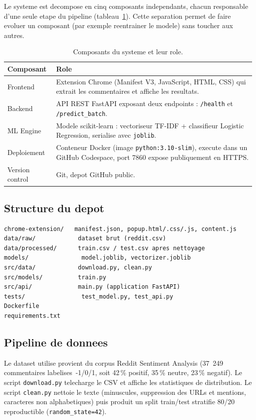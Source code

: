 \documentclass[11pt,a4paper]{article}
\begin{document}
Le systeme est decompose en cinq composants independants, chacun responsable d'une seule etape du pipeline (tableau~\ref{tab:composants}). Cette separation permet de faire evoluer un composant (par exemple reentrainer le modele) sans toucher aux autres.

\begin{table}[h]
\centering
\begin{tabular}{@{}p{3cm}p{10cm}@{}}
\toprule
\textbf{Composant} & \textbf{Role} \\
\midrule
Frontend & Extension Chrome (Manifest V3, JavaScript, HTML, CSS) qui extrait les commentaires et affiche les resultats. \\
Backend & API REST FastAPI exposant deux endpoints : \texttt{/health} et \texttt{/predict\_batch}. \\
ML Engine & Modele scikit-learn : vectoriseur TF-IDF + classifieur Logistic Regression, serialise avec \texttt{joblib}. \\
Deploiement & Conteneur Docker (image \texttt{python:3.10-slim}), execute dans un GitHub Codespace, port 7860 expose publiquement en HTTPS. \\
Version control & Git, depot GitHub public. \\
\bottomrule
\end{tabular}
\caption{Composants du systeme et leur role.}
\label{tab:composants}
\end{table}

\subsection{Structure du depot}

\begin{verbatim}
chrome-extension/   manifest.json, popup.html/.css/.js, content.js
data/raw/            dataset brut (reddit.csv)
data/processed/      train.csv / test.csv apres nettoyage
models/               model.joblib, vectorizer.joblib
src/data/            download.py, clean.py
src/models/          train.py
src/api/             main.py (application FastAPI)
tests/                test_model.py, test_api.py
Dockerfile
requirements.txt
\end{verbatim}

\subsection{Pipeline de donnees}

Le dataset utilise provient du corpus Reddit Sentiment Analysis (37~249 commentaires labelises~-1/0/1, soit 42\,\% positif, 35\,\% neutre, 23\,\% negatif). Le script \texttt{download.py} telecharge le CSV et affiche les statistiques de distribution. Le script \texttt{clean.py} nettoie le texte (minuscules, suppression des URLs et mentions, caracteres non alphabetiques) puis produit un split train/test stratifie 80/20 reproductible (\texttt{random\_state=42}).
\end{document}
